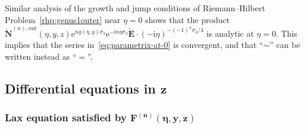 \begin{Remark}\label{rem:zero}
Similar analysis of the growth and jump conditions of Riemann--Hilbert Problem~\ref{rhp:genus1outer} near $\eta=0$ shows that the product $\breve{\mathbf{N}}^{(n),\mathrm{out}}(\eta,y,z)\mathrm{e}^{ng(\eta,y)\sigma_3}\mathrm{e}^{-\mathrm{i} n\eta\sigma_3}\widetilde{\mathbf{E}}\cdot(-\mathrm{i}\eta)^{-(-1)^n\sigma_3/4}$ is analytic at $\eta=0$. This implies that the series in~\eqref{eq:parametrix-at-0} is convergent, and that ``$\sim$'' can be written instead as ``$=$''.
\end{Remark}

\subsection[Differential equations in z]{Differential equations in $\boldsymbol{z}$}\label{sec:ODEz}

\subsubsection[Lax equation satisfied by F\^{}\{(n)\}(eta,y,z)]{Lax equation satisfied by $\boldsymbol{\mathbf{F}^{(n)}(\eta,y,z)}$}

